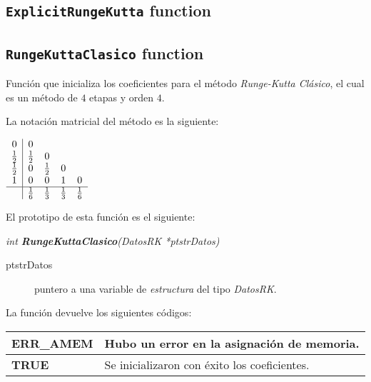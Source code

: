 \subsection{\texttt{ExplicitRungeKutta} function}

\subsection{\texttt{RungeKuttaClasico} function}

Funci\'on que inicializa los coeficientes para el m\'etodo \emph{Runge-Kutta 
Cl\'asico}, el cual es un m\'etodo de $4$ etapas y orden $4$.\newline

La notaci\'on matricial del m\'etodo es la siguiente:

\begin{center}
$
\begin{array}{c|cccc}
0 & 0 \\
\frac{1}{2} & \frac{1}{2} & 0 \\
\frac{1}{2} & 0 & \frac{1}{2} & 0 \\
1 & 0 & 0 & 1 & 0 \\
\hline
 & \frac{1}{6} & \frac{1}{3} & \frac{1}{3} & \frac{1}{6} \\
\end{array}
$
\end{center}

El prototipo de esta funci\'on es el siguiente:

\begin{center}
\emph{int \textbf{RungeKuttaClasico}(DatosRK *ptstrDatos)}
\end{center}

\begin{description}
\item[ptstrDatos] puntero a una variable de \emph{estructura} del tipo
\emph{DatosRK}.
\end{description}

La funci\'on devuelve los siguientes c\'odigos:

\begin{center}
\begin{tabular}{|l|l|}
\hline
\textbf{ERR\_AMEM} & Hubo un error en la asignaci\'on de memoria. \\
\hline
\textbf{TRUE} & Se inicializaron con \'exito los coeficientes. \\
\hline
\end{tabular}
\end{center}

